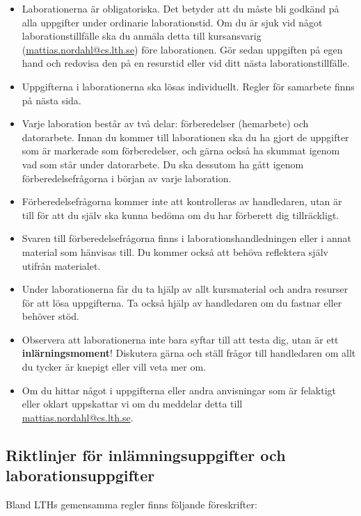 \documentclass[fleqn, article, a4paper]{memoir}
\begin{document}
\begin{itemize}
    \item Laborationerna är obligatoriska. Det betyder att du måste bli godkänd på alla uppgifter under ordinarie laborationstid. Om du är sjuk vid något laborationstillfälle ska du anmäla detta till kursansvarig (\url{mattias.nordahl@cs.lth.se}) före laborationen. Gör sedan uppgiften på egen hand och redovisa den på en resurstid eller vid ditt nästa laborationstillfälle.

    \item Uppgifterna i laborationerna ska lösas individuellt. Regler för samarbete finns på nästa sida.

    \item Varje laboration består av två delar: förberedelser (hemarbete) och datorarbete. Innan du kommer till laborationen ska du ha gjort de uppgifter som är markerade som förberedelser, och gärna också ha skummat igenom vad som står under datorarbete. Du ska dessutom ha gått igenom förberedelsefrågorna i början av varje laboration.
    
    \item Förberedelsefrågorna kommer inte att kontrolleras av handledaren, utan är till för att du själv ska kunna bedöma om du har förberett dig tillräckligt.

	\item Svaren till förberedelsefrågorna finns i laborationshandledningen eller i annat material som hänvisas till. Du kommer också att behöva reflektera själv utifrån materialet.

    \item Under laborationerna får du ta hjälp av allt kursmaterial och andra resurser för att lösa uppgifterna. Ta också hjälp av handledaren om du fastnar eller behöver stöd.

    \item Observera att laborationerna inte bara syftar till att testa dig, utan är ett \textbf{inlärningsmoment}! Diskutera gärna och ställ frågor till handledaren om allt du tycker är knepigt eller vill veta mer om.

    \item Om du hittar något i uppgifterna eller andra anvisningar som är felaktigt eller oklart uppskattar vi om du meddelar detta till \url{mattias.nordahl@cs.lth.se}.
\end{itemize}



\newpage
\subsection*{Riktlinjer för inlämningsuppgifter och laborationsuppgifter}
Bland LTHs gemensamma regler finns följande föreskrifter:
\end{document}
